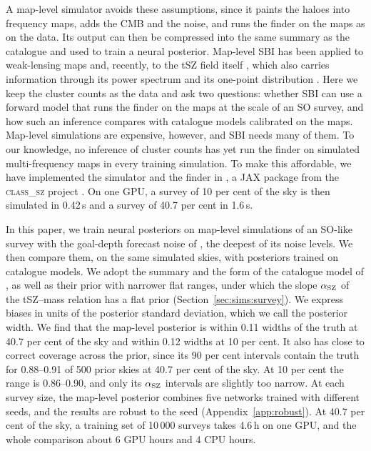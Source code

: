 A map-level simulator avoids these assumptions, since it paints the haloes into frequency maps, adds the
CMB and the noise, and runs the finder on the maps as on the data. Its output can then be compressed into
the same summary as the catalogue and used to train a neural posterior. Map-level SBI has been applied to
weak-lensing maps \citep{Jeffrey2021} and, recently, to the tSZ field itself \citep{EmbilVillagra2026},
which also carries information through its power spectrum \citep{Bolliet2018,Planck2016XXII} and its
one-point distribution \citep{Hill2014}. Here we keep the cluster counts as the data and ask two
questions: whether SBI can use a forward model that runs the finder on the maps at the scale of an SO
survey, and how such an inference compares with catalogue models calibrated on the maps. Map-level
simulations are expensive, however, and SBI needs many of them. To our knowledge, no inference of cluster
counts has yet run the finder on simulated multi-frequency maps in every training simulation. To make this
affordable, we have implemented the simulator and the finder in \classyszlite{}, a JAX
\citep{Bradbury2018} package from the \textsc{class\_sz} project \citep{Bolliet2023}. On one GPU, a
survey of 10 per cent of the sky is then simulated in 0.42\,s and a survey of 40.7 per cent in 1.6\,s.

In this paper, we train neural posteriors on map-level simulations of an SO-like survey with the
goal-depth forecast noise of \citet{SO2019}, the deepest of its noise levels. We then compare them, on the same simulated skies, with posteriors trained on
catalogue models. We adopt the summary and the form of
the catalogue model of \citet{Zubeldia2025}, as well as their prior with narrower flat ranges, under which
the slope $\alpha_\mathrm{SZ}$ of the tSZ--mass relation has a flat prior (Section~\ref{sec:sims:survey}). We express
biases in units of the posterior standard deviation, which we call the posterior width. We find that the
map-level posterior is within 0.11 widths of the truth at 40.7 per cent of the sky and within 0.12 widths
at 10 per cent. It also has close to correct coverage across the prior, since its 90 per cent intervals
contain the truth for 0.88--0.91 of 500 prior skies at 40.7 per cent of the sky. At 10 per cent the range
is 0.86--0.90, and only its $\alpha_\mathrm{SZ}$ intervals are slightly too narrow. At each
survey size, the map-level posterior combines five networks trained with different seeds, and the results
are robust to the seed (Appendix~\ref{app:robust}). At 40.7 per cent of the sky, a training set of
10\,000 surveys takes 4.6\,h on one GPU, and the whole comparison about 6 GPU hours and 4 CPU hours.

